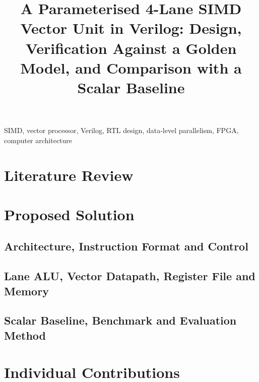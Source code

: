 \documentclass[conference]{IEEEtran}
\begin{document}
\title{A Parameterised 4-Lane SIMD Vector Unit in Verilog:
Design, Verification Against a Golden Model, and Comparison with a
Scalar Baseline}

\author{
\and
{}
\and
{}
\and
{}
\and
{}
}


\maketitle

\begin{abstract}

\end{abstract}

\begin{IEEEkeywords}
SIMD, vector processor, Verilog, RTL design, data-level parallelism,
FPGA, computer architecture
\end{IEEEkeywords}

\section{Literature Review}


\section{Proposed Solution}

\subsection{Architecture, Instruction Format and Control}


\subsection{Lane ALU, Vector Datapath, Register File and Memory}
\label{sec:datapath}


\subsection{Scalar Baseline, Benchmark and Evaluation Method}
\label{sec:evaluation}


\section{Individual Contributions}




\end{document}
